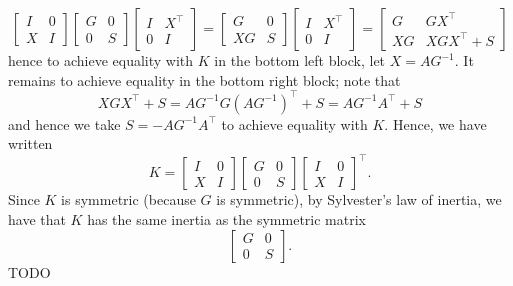 \documentclass{../kin_math}
\begin{document}
\begin{questions}
\begin{solution}
\begin{equation*}
      \begin{bmatrix} I & 0 \\ X & I \end{bmatrix} \begin{bmatrix} G & 0 \\ 0 & S \end{bmatrix} \begin{bmatrix} I & X^\top \\ 0 & I \end{bmatrix} = \begin{bmatrix} G & 0 \\ XG & S \end{bmatrix} \begin{bmatrix} I & X^\top \\ 0 & I \end{bmatrix} = \begin{bmatrix} G & GX^\top \\ XG & XGX^\top + S \end{bmatrix}
    \end{equation*}
    hence to achieve equality with $K$ in the bottom left block, let $X = AG^{-1}$. It remains to achieve equality in the bottom right block; note that
    \begin{equation*}
      XGX^\top + S = AG^{-1} G (AG^{-1})^\top + S = AG^{-1}A^\top + S
    \end{equation*}
    and hence we take $S = -AG^{-1}A^\top$ to achieve equality with $K$. Hence, we have written
    \begin{equation*}
      K = \begin{bmatrix} I & 0 \\ X & I \end{bmatrix} \begin{bmatrix} G & 0 \\ 0 & S \end{bmatrix} \begin{bmatrix} I & 0 \\ X & I \end{bmatrix}^\top.
    \end{equation*}
    Since $K$ is symmetric (because $G$ is symmetric), by Sylvester's law of inertia, we have that $K$ has the same inertia as the symmetric matrix
    \begin{equation*}
      \begin{bmatrix}
        G & 0 \\ 0 & S
      \end{bmatrix}.
    \end{equation*}
    TODO
  \end{solution}


\end{questions}
\end{document}
